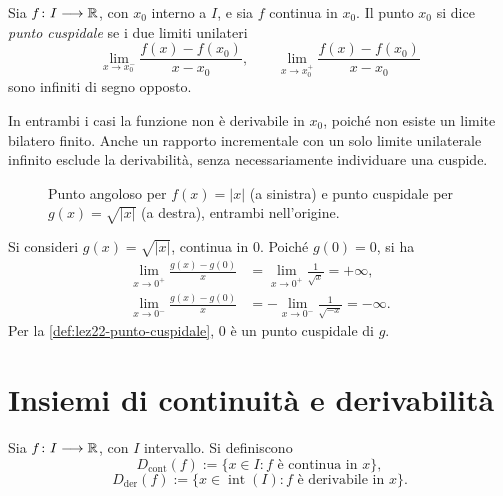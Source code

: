 \begin{definition}
\label{def:lez22-punto-cuspidale}
Sia \(f\colon I\longrightarrow\mathbb{R}\), con \(x_0\)
interno a \(I\), e sia \(f\) continua in \(x_0\). Il punto \(x_0\) si dice
\emph{punto cuspidale} se i due limiti unilateri
\[
  \lim_{x\to x_0^-}\frac{f(x)-f(x_0)}{x-x_0},
  \qquad
  \lim_{x\to x_0^+}\frac{f(x)-f(x_0)}{x-x_0}
\]
sono infiniti di segno opposto.
\end{definition}

In entrambi i casi la funzione non è derivabile in
\(x_0\), poiché non esiste un limite bilatero finito.
Anche un rapporto incrementale con un solo limite
unilaterale infinito esclude la derivabilità, senza
necessariamente individuare una cuspide.

\clearpage

\begin{figure}[htbp]
  \centering
  
  \caption{Punto angoloso per \(f(x)=|x|\) (a sinistra)
  e punto cuspidale per \(g(x)=\sqrt{|x|}\) (a destra),
  entrambi nell'origine.}
  \label{fig:lez22-punti-non-derivabilita}
\end{figure}

\begin{example}
\label{ex:lez22-radice-valore-assoluto}
Si consideri \(g(x)=\sqrt{|x|}\), continua in \(0\).
Poiché \(g(0)=0\), si ha
\[
\begin{aligned}
  \lim_{x\to0^+}\frac{g(x)-g(0)}{x}
    &=\lim_{x\to0^+}\frac{1}{\sqrt{x}}=+\infty,\\
  \lim_{x\to0^-}\frac{g(x)-g(0)}{x}
    &=-\lim_{x\to0^-}\frac{1}{\sqrt{-x}}=-\infty.
\end{aligned}
\]
Per la \cref{def:lez22-punto-cuspidale},
\(0\) è un punto cuspidale di \(g\).
\end{example}

\section{Insiemi di continuità e derivabilità}
\label{sec:lez22-insiemi-derivabilita}

\begin{definition}
\label{def:lez22-insiemi-continuita-derivabilita}
Sia \(f\colon I\longrightarrow\mathbb{R}\), con \(I\)
intervallo. Si definiscono
\[
  D_{\mathrm{cont}}(f)
  :=\{x\in I:f\text{ è continua in }x\},
\]
\[
  D_{\mathrm{der}}(f)
  :=\{x\in\operatorname{int}(I):f\text{ è derivabile in }x\}.
\]
\end{definition}

